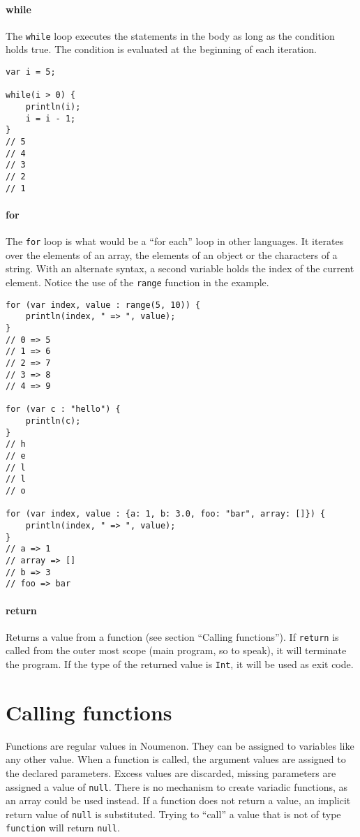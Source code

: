 \documentclass[a4paper, parskip, 10pt]{scrartcl}
\begin{document}
\paragraph{while}
The \texttt{while} loop executes the statements in the body as long as the
condition holds true. The condition is evaluated at the beginning of each
iteration.

\begin{lstlisting}
var i = 5;

while(i > 0) {
    println(i);
    i = i - 1;
}
// 5
// 4
// 3
// 2
// 1
\end{lstlisting}

\paragraph{for}
The \texttt{for} loop is what would be a \enquote{for each} loop in other
languages. It iterates over the elements of an array, the elements of an object
or the characters of a string. With an alternate syntax, a second variable
holds the index of the current element. Notice the use of the \texttt{range}
function in the example.

\begin{lstlisting}
for (var index, value : range(5, 10)) {
    println(index, " => ", value);
}
// 0 => 5
// 1 => 6
// 2 => 7
// 3 => 8
// 4 => 9

for (var c : "hello") {
    println(c);
}
// h
// e
// l
// l
// o

for (var index, value : {a: 1, b: 3.0, foo: "bar", array: []}) {
    println(index, " => ", value);
}
// a => 1
// array => []
// b => 3
// foo => bar
\end{lstlisting}

\paragraph{return}
Returns a value from a function (see section \enquote{Calling functions}). If
\texttt{return} is called from the outer most scope (main program, so to
speak), it will terminate the program. If the type of the returned value is
\texttt{Int}, it will be used as exit code.

\section{Calling functions}
Functions are regular values in Noumenon. They can be assigned to variables
like any other value. When a function is called, the argument values are
assigned to the declared parameters. Excess values are discarded, missing
parameters are assigned a value of \texttt{null}. There is no mechanism to
create variadic functions, as an array could be used instead. If a function
does not return a value, an implicit return value of \texttt{null} is
substituted. Trying to \enquote{call} a value that is not of type
\texttt{function} will return \texttt{null}.
\end{document}
